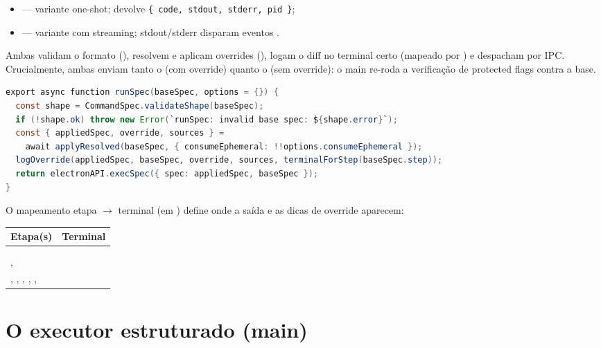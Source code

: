 \begin{itemize}[leftmargin=1.4em]
  \item {} — variante one-shot; devolve
    \lstinline|{ code, stdout, stderr, pid }|;
  \item {} — variante com streaming;
    stdout/stderr disparam eventos .
\end{itemize}

\noindent Ambas validam o formato (), resolvem e aplicam
overrides (), logam o diff no terminal certo (mapeado por
) e despacham por IPC. Crucialmente, ambas enviam tanto o
 (com override) quanto o  (sem override): o main
re-roda a verificação de protected flags contra a base.

\begin{lstlisting}[language=Java]
export async function runSpec(baseSpec, options = {}) {
  const shape = CommandSpec.validateShape(baseSpec);
  if (!shape.ok) throw new Error(`runSpec: invalid base spec: ${shape.error}`);
  const { appliedSpec, override, sources } =
    await applyResolved(baseSpec, { consumeEphemeral: !!options.consumeEphemeral });
  logOverride(appliedSpec, baseSpec, override, sources, terminalForStep(baseSpec.step));
  return electronAPI.execSpec({ spec: appliedSpec, baseSpec });
}
\end{lstlisting}

\noindent O mapeamento etapa $\to$ terminal (em ) define
onde a saída e as dicas de override aparecem:

\begin{tabularx}{\linewidth}{Y Y}
  \toprule
  \textbf{Etapa(s)} & \textbf{Terminal} \\
  \midrule
   &  \\
   &  \\
  ,  &  \\
  , , , , ,  &  \\
  \bottomrule
\end{tabularx}

\section{O executor estruturado (main)}
\label{sec:08-executor}

